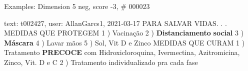 \begin{frame}{Examples: Dimension 5 neg, score -3, \# 000023}
\footnotesize
\begin{alertblock}{text: t002427, user: AllanGarcs1, 2021-03-17}
PARA SALVAR VIDAS. . . MEDIDAS QUE PROTEGEM 1 ) Vacinação 2 ) 
\textbf{Distanciamento} \textbf{social} 3 ) \textbf{Máscara} 4 ) Lavar mãos 5 ) 
Sol, Vit D e Zinco MEDIDAS QUE CURAM 1 ) Tratamento \textbf{PRECOCE} com 
Hidroxicloroquina, Ivermectina, Azitromicina, Zinco, Vit. D e C 2 ) Tratamento 
individualizado pra cada fase 
\end{alertblock}
\end{frame}
